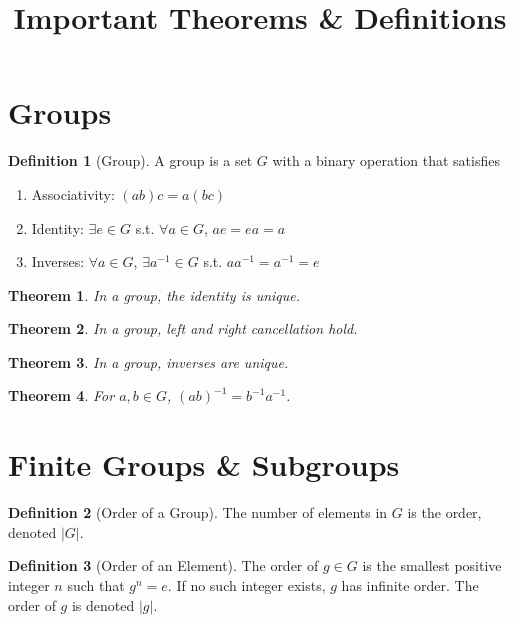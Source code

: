 \documentclass{article}
\title{Important Theorems \& Definitions}
\date{}
\newtheorem{theorem}{Theorem}[section]
\theoremstyle{definition}
\newtheorem*{definition}{Definition}
\begin{document}
\maketitle

\section{Groups}

\begin{definition}[Group] A group is a set $G$ with a binary operation that satisfies \begin{enumerate}
    \item Associativity: $(ab)c = a(bc)$
    \item Identity: $\exists e \in G$ s.t. $\forall a \in G$, $ae = ea = a$
    \item Inverses: $\forall a \in G$, $\exists a^{-1} \in G$ s.t. $aa^{-1} = a^{-1} = e$
\end{enumerate}
\end{definition}

\begin{theorem}
    In a group, the identity is unique.
\end{theorem}

\begin{theorem}
    In a group, left and right cancellation hold.
\end{theorem}

\begin{theorem}
    In a group, inverses are unique.
\end{theorem}

\begin{theorem}
    For $a, b \in G$, $(ab)^{-1} = b^{-1}a^{-1}$.
\end{theorem}

\section{Finite Groups \& Subgroups}

\begin{definition}[Order of a Group]
    The number of elements in $G$ is the order, denoted $|G|$.
\end{definition}

\begin{definition}[Order of an Element]
    The order of $g \in G$ is the smallest positive integer $n$ such that $g^n = e$. If no such integer exists, $g$ has infinite order. The order of $g$ is denoted $|g|$.
\end{definition}
\end{document}
